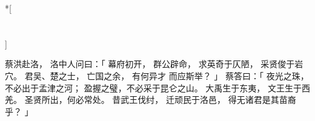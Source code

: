 
\switchcolumn[0]*[\section{}]

蔡洪赴洛，
洛中人问曰：「
    幕府初开，
    群公辟命，
    求英奇于仄陋，
    采贤俊于岩穴。
    君吴、楚之士，
    亡国之余，
    有何异才
    而应斯举？
」
蔡答曰：「
    夜光之珠，不必出于孟津之河；
    盈握之璧，不必采于昆仑之山。
    大禹生于东夷，
    文王生于西羌。
    圣贤所出，何必常处。
    昔武王伐纣，
    迁顽民于洛邑，
    得无诸君是其苗裔乎？
」

\switchcolumn



